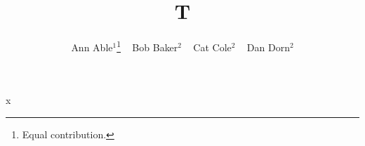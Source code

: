 \documentclass{article}
\begin{document}
\title{T}
\author{{Ann Able$^{1}$\thanks{Equal contribution.} ~ Bob Baker$^{2}$ ~ Cat Cole{$^{2}$} ~ Dan Dorn{$^{2}$}}}
\maketitle
x
\end{document}
